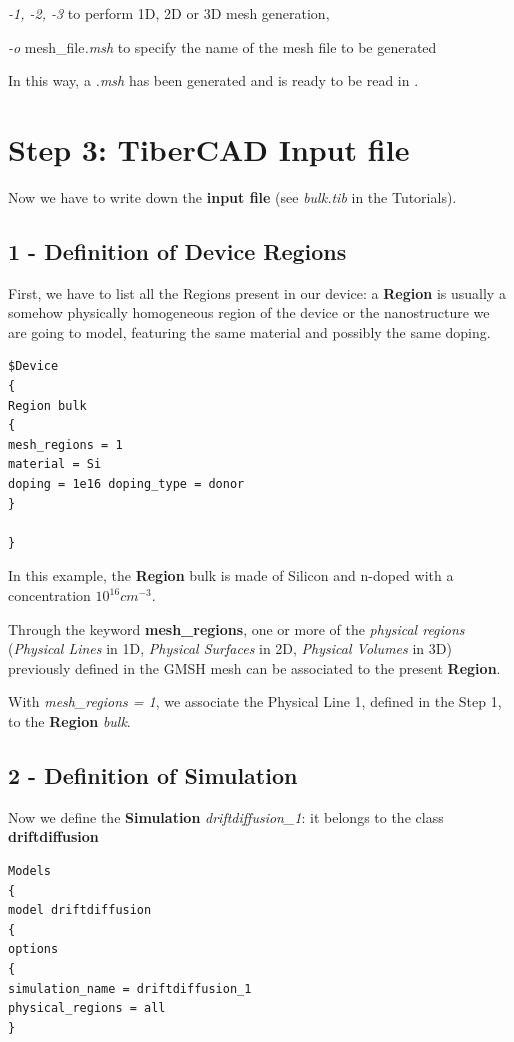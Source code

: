 \textit{-1, -2, -3} to perform 1D, 2D or 3D mesh generation,

\textit{-o} mesh\_file\textit{.msh} to specify the name of the mesh file to be generated

In this way, a \textit{.msh} has been generated and is ready to be read in \TiberCAD{}. 





\section*{Step 3: TiberCAD{}  Input file  }

Now we have to write down the \TiberCAD{} \textbf{input file} (see \textit{bulk.tib} in  the  Tutorials).


\subsection* {1 - Definition of Device Regions}
First, we have to list all the \TiberCAD{} Regions present in our device: a \TiberCAD{} \textbf{Region} is usually a somehow physically homogeneous  region of the device or the nanostructure we are going to model, featuring the same material and possibly the same doping.
\begin{verbatim}
$Device
{
Region bulk
{
mesh_regions = 1
material = Si
doping = 1e16 doping_type = donor
}

}
\end{verbatim}
In this example, the \TiberCAD{} \textbf{Region} bulk is made of Silicon and n-doped with a concentration $10^{16} cm^{-3}$.

Through the keyword  \textbf{mesh\_regions}, one or more of the \textit{physical regions} (\textit{Physical Lines} in 1D, \textit{Physical Surfaces} in 2D, \textit{Physical Volumes} in 3D) previously defined in the GMSH mesh can be associated to the present  \TiberCAD{} \textbf{Region}.

With \textit{mesh\_regions = 1}, we associate the Physical Line 1, defined in the Step 1, to the \TiberCAD{} \textbf{Region} \textit{bulk}.

\subsection* {2 - Definition of Simulation}

Now we define the \textbf{Simulation} \textit{driftdiffusion\_1}: it belongs to  the class \textbf{driftdiffusion}
\begin{verbatim}
Models
{
model driftdiffusion
{
options
{
simulation_name = driftdiffusion_1
physical_regions = all
}
\end{verbatim}


